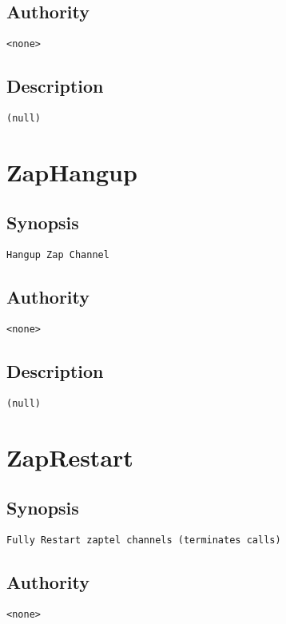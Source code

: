 \subsection{Authority}
\begin{verbatim}
<none>
\end{verbatim}
\subsection{Description}
\begin{verbatim}
(null)
\end{verbatim}


\section{ZapHangup}
\subsection{Synopsis}
\begin{verbatim}
Hangup Zap Channel
\end{verbatim}
\subsection{Authority}
\begin{verbatim}
<none>
\end{verbatim}
\subsection{Description}
\begin{verbatim}
(null)
\end{verbatim}


\section{ZapRestart}
\subsection{Synopsis}
\begin{verbatim}
Fully Restart zaptel channels (terminates calls)
\end{verbatim}
\subsection{Authority}
\begin{verbatim}
<none>
\end{verbatim}

